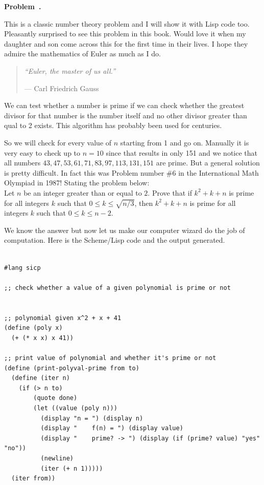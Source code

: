 \documentclass[10pt]{article}
\newcounter{problem}
\newenvironment{problem}[1][]{
  \refstepcounter{problem}
  \par\noindent\textbf{Problem~\theproblem. #1}\par
  \vspace{0.5em}
}{\vspace{1em}}
\begin{document}
\begin{problem} %
  This is a classic number theory problem and I will show it with Lisp code too. Pleasantly surprised to see this problem in this book.
  Would love it when my daughter and son come across this for the first time in their lives. I hope they admire the
  mathematics of Euler as much as I do. 

  \begin{quote}
    \itshape
    ``Euler, the master of us all.''
    
    \hfill --- Carl Friedrich Gauss
  \end{quote}

  We can test whether a number is prime if we can check whether the greatest divisor for that number is the number itself and no other divisor greater
  than qual to 2 exists. This algorithm has probably been used for centuries.

  So we will check for every value of $n$ starting from 1 and go on. Manually it is very easy to check up to $n = 10$ since that results in
  only 151 and we notice that all numbers ${43, 47, 53, 61, 71, 83, 97, 113, 131, 151}$ are prime. But a general solution is pretty difficult.
  In fact this was Problem number \#6 in the International Math Olympiad in 1987! Stating the problem below:\\

  Let $n$ be an integer greater than or equal to $2$. Prove that if $k^2 + k + n$ is prime for all integers $k$ such
  that $0 \le k \le \sqrt{n / 3}$, then $k^2 + k + n$ is prime for all integers $k$ such that $0 \le k \le n - 2$.

  We know the answer but now let us make our computer wizard do the job of computation. Here is the Scheme/Lisp code and the output generated.

\begin{lstlisting}

#lang sicp

;; check whether a value of a given polynomial is prime or not


;; polynomial given x^2 + x + 41
(define (poly x)
  (+ (* x x) x 41))

;; print value of polynomial and whether it's prime or not
(define (print-polyval-prime from to)
  (define (iter n)
    (if (> n to)
        (quote done)
        (let ((value (poly n)))
          (display "n = ") (display n)
          (display "    f(n) = ") (display value)
          (display "    prime? -> ") (display (if (prime? value) "yes" "no"))
          (newline)
          (iter (+ n 1)))))
  (iter from))


\end{lstlisting}
\end{problem}
\end{document}
